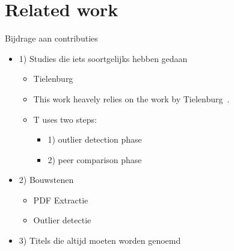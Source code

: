\documentclass{ou-report}
\newcommand{\todo}[1]{{\color{red} TODO: #1}}
\newcommand{\outline}[1]{{\color{blue} #1}}
\begin{document}



\chapter{Related work}
\label{chp:related_work}
\outline{
Bijdrage aan contributies
\begin{itemize}
    \item 1) Studies die iets soortgelijks hebben gedaan
    \begin{itemize}
        \item Tielenburg
        \item This work heavely relies on the work by Tielenburg~\cite{TEJ2017}.
        \item T uses two steps:
        \begin{itemize}
            \item 1) outlier detection phase
            \item 2) peer comparison phase
        \end{itemize}
    \end{itemize}
    \item 2) Bouwstenen
    \begin{itemize}
        \item PDF Extractie
        \item Outlier detectie
    \end{itemize}
    \item 3) Titels die altijd moeten worden genoemd
\end{itemize}
}
\end{document}
